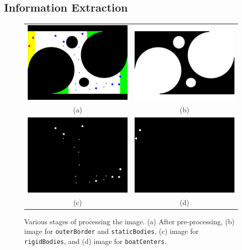 \subsection{Information Extraction}

\begin{figure}
\begin{tabular}{cc}
  \includegraphics[width=65mm]{img/ImageProcessing/LevelImages/img_3.png} & \includegraphics[width=65mm]{img/ImageProcessing/LevelImages/img_5.png} \\
(a) & (b) \\[6pt]
  \includegraphics[width=65mm]{img/ImageProcessing/LevelImages/img_10.png} & \includegraphics[width=65mm]{img/ImageProcessing/LevelImages/img_12.png} \\
(c) & (d) \\[6pt]
\end{tabular}
\caption{Various stages of processing the image. (a) After pre-processing, (b) image for \protect\lstinline|outerBorder| and \protect\lstinline|staticBodies|, (c) image for \protect\lstinline|rigidBodies|, and (d) image for \protect\lstinline|boatCenters|.\label{LevelImages}}
\end{figure}

